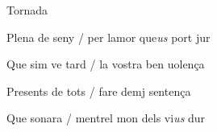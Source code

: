 \documentclass[12pt]{article}
\begin{document}
\begin{estrofaExtra}%




\begin{tornada}

Tornada

\end{tornada}


\end{estrofaExtra}


\begin{estrofa}

 Plena de seny / per lamor que\textit{us} port jur

 Que sim ve tard / la vostra ben uolen\c{c}a

 Presents de tots / fare demj senten\c{c}a

 Que sonara / mentrel mon dels vi\textit{us} dur

\end{estrofa}
\end{document}
